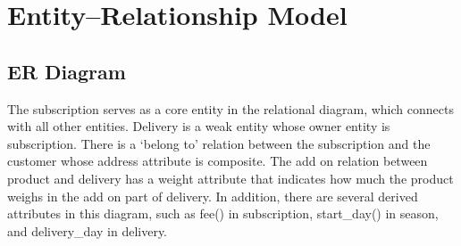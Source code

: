 \section{Entity--Relationship Model}
\label{sec:er}

\subsection{ER Diagram}
\label{sec:er-diagram}
The subscription serves as a core entity in the relational diagram, which connects with all other entities. Delivery is a weak entity whose owner entity is subscription. There is a `belong to' relation between the subscription and the customer whose address attribute is composite. The add on relation between product and delivery has a weight attribute that indicates how much the product weighs in the add on part of delivery. In addition, there are several derived attributes in this diagram, such as fee() in subscription, start\_day() in season, and delivery\_day in delivery. 


